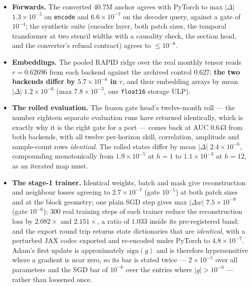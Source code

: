 \documentclass[10pt]{article}
\begin{document}
\begin{itemize}\itemsep2pt
\item \textbf{Forwards.} The converted 40.7M anchor agrees with PyTorch to
  max $|\Delta|$ $1.3\times10^{-5}$ on \texttt{encode} and
  $6.6\times10^{-7}$ on the decoder query, against a gate of $10^{-4}$;
  the synthetic suite (encoder layer, both patch sizes, the temporal
  transformer at two stencil widths with a causality check, the section
  head, and the converter's refusal contract) agrees to $\le10^{-6}$.
\item \textbf{Embeddings.} The pooled RAPID ridge over the real monthly
  tensor reads $r = 0.62696$ from each backend against the archived control
  $0.627$; \textbf{the two backends differ by $5.7\times10^{-8}$ in $r$},
  and their embedding arrays by mean $|\Delta|$ $1.2\times10^{-6}$ (max
  $7.8\times10^{-3}$, one \texttt{float16} storage ULP).
\item \textbf{The rolled evaluation.} The frozen gate head's twelve-month
  roll --- the number eighteen separate evaluation runs have returned
  identically, which is exactly why it is the right gate for a port ---
  comes back at AUC $0.643$ from both backends, with all twelve
  per-horizon skill, correlation, amplitude and sample-count rows
  \emph{identical}. The rolled states differ by mean $|\Delta|$
  $2.4\times10^{-6}$, compounding monotonically from $1.9\times10^{-5}$ at
  $h=1$ to $1.1\times10^{-3}$ at $h=12$, as an iterated map must.
\item \textbf{The stage-1 trainer.} Identical weights, batch and mask give
  reconstruction and neighbour losses agreeing to $2.7\times10^{-7}$ (gate
  $10^{-5}$) at both patch sizes and at the block geometry; one plain SGD
  step gives max $|\Delta w|$ $7.5\times10^{-9}$ (gate $10^{-6}$); 300 real
  training steps of each trainer reduce the reconstruction loss by
  $2.082\times$ and $2.151\times$, a ratio of $1.033$ inside its
  pre-registered band; and the export round trip returns state dictionaries
  that are \emph{identical}, with a perturbed JAX codec exported and
  re-encoded under PyTorch to $4.8\times10^{-7}$. Adam's first update is
  approximately $\mathrm{sign}(g)$ and is therefore hypersensitive where a
  gradient is near zero, so its bar is stated twice --- $2\times10^{-5}$
  over all parameters and the SGD bar of $10^{-6}$ over the entries where
  $|g| > 10^{-6}$ --- rather than loosened once.
\end{itemize}
\end{document}
